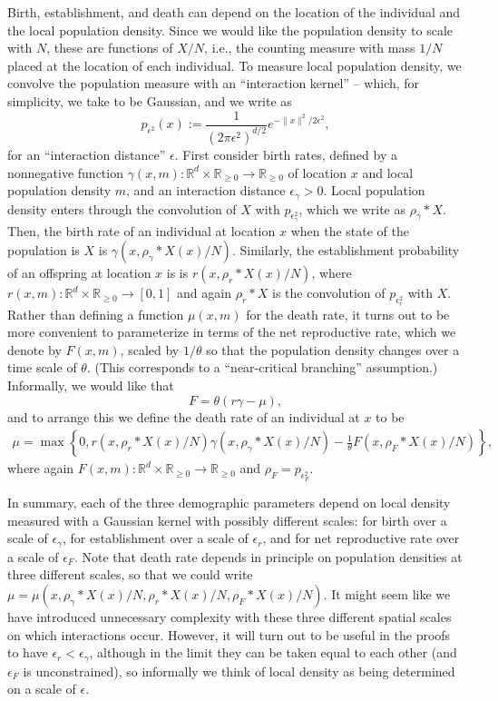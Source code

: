 \documentclass[12pt]{article}
\newcommand{\IR}{\mathbb R}
\newcommand{\kernel}{\rho}  %
\newcommand{\smooth}[1]{\kernel_{#1} \! * \!}  %
\begin{document}
Birth, establishment, and death can depend on the location of the individual
and the local population density.
Since we would like the population density to scale with $N$,
these are functions of $X/N$, i.e.,
the counting measure with mass $1/N$ placed at the location of each individual.
To measure local population density, we convolve the population measure with
an ``interaction kernel'' -- which, for simplicity, we take to be Gaussian,
and we write as
$$
    p_{\epsilon^2}(x) := \frac{1}{(2 \pi \epsilon^2)^{d/2}} e^{-\|x\|^2 / 2 \epsilon^2} ,
$$
for an ``interaction distance'' $\epsilon$.
First consider birth rates, defined by
a nonnegative function $\gamma(x, m) : \IR^d \times \IR_{\ge 0} \to \IR_{\ge 0}$
of location $x$ and local population density $m$,
and an interaction distance $\epsilon_\gamma > 0$.
Local population density enters through the convolution of $X$ with $p_{\epsilon_\gamma^2}$,
which we write as $\smooth{\gamma} X$.
Then, the birth rate of an individual at location $x$ when the state of the population is $X$
is $\gamma(x, \smooth{\gamma} X(x) / N)$.
Similarly, the establishment probability of an offspring at location $x$ is
is $r(x, \smooth{r} X(x) / N)$,
where $r(x, m) : \IR^d \times \IR_{\ge 0} \to [0, 1]$
and again $\smooth{r} X$ is the convolution of $p_{\epsilon_r^2}$ with $X$.
Rather than defining a function $\mu(x, m)$ for the death rate,
it turns out to be more convenient to parameterize in terms of the net reproductive rate,
which we denote by $F(x, m)$,
scaled by $1/\theta$
so that the population density changes over a time scale of $\theta$.
(This corresponds to a ``near-critical branching'' assumption.)
Informally, we would like that
$$
    F = \theta (r \gamma - \mu) ,
$$
and to arrange this we define
the death rate of an individual at $x$ to be
\begin{align} \label{eqn:mu_defn}
    \mu
    =
    \max\left\{0, 
        r(x, \smooth{r} X(x) / N) \gamma(x, \smooth{\gamma} X(x) / N)
        - \frac{1}{\theta} F(x, \smooth{F} X(x) / N)
    \right\} ,
\end{align}
where again $F(x, m) : \IR^d \times \IR_{\ge 0} \to \IR_{\ge 0}$
and $\kernel_F = p_{\epsilon_F^2}$.

In summary, each of the three demographic parameters depend on local density measured
with a Gaussian kernel with possibly different scales:
for birth over a scale of $\epsilon_\gamma$,
for establishment over a scale of $\epsilon_r$,
and for net reproductive rate over a scale of $\epsilon_F$.
Note that death rate depends in principle on population densities at three different scales,
so that we could write $\mu = \mu(x, \smooth{\gamma} X(x) / N, \smooth{r} X(x) / N, \smooth{F} X(x) / N)$.
It might seem like
we have introduced unnecessary complexity
with these three different spatial scales on which interactions occur.
However,
it will turn out to be useful in the proofs to have $\epsilon_r < \epsilon_\gamma$,
although in the limit they can be taken equal to each other
(and $\epsilon_F$ is unconstrained),
so informally we think of local density as being determined on a scale of $\epsilon$.
\end{document}
